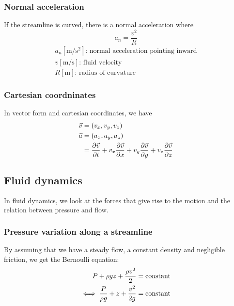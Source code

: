 \documentclass[10pt, twocolumn]{article}
\begin{document}
\subsubsection{Normal acceleration}
If the streamline is curved, there is a normal acceleration where
\[
  a_n = \frac{v^2}{R}
\]
\[
  \begin{array}{|l}
    a_n [\si{\metre\per\second\squared}] \text{: normal acceleration pointing inward} \\
    v [\si{\metre\per\second}] \text{: fluid velocity}                                \\
    R [\si{\metre}] \text{: radius of curvature}
  \end{array}
\]


\subsubsection{Cartesian coordninates}
In vector form and cartesian coordinates, we have
\begin{align*}
  \vec{v} & = \left( v_x, v_y, v_z \right)                                                                                                               \\
  \vec{a} & = \left( a_x, a_y, a_z \right)                                                                                                               \\
          & = \frac{\partial \vec{v}}{\partial t} + v_x\frac{\partial \vec{v}}{\partial x} + v_y\frac{\partial \vec{v}}{\partial y} + v_z\frac{\partial \vec{v}}{\partial z}
\end{align*}


\subsection{Fluid dynamics}
In fluid dynamics, we look at the forces that give rise to the motion and the relation between pressure and flow.

\subsubsection{Pressure variation along a streamline}
By assuming that we have a steady flow, a constant density and negligible friction, we get the Bernoulli equation:
\begin{align*}
  P + \rho g z + \frac{\rho v^2}{2}          & = \mathrm{constant} \\
  \iff \frac{P}{\rho g} + z + \frac{v^2}{2g} & = \mathrm{constant}
\end{align*}
\end{document}
